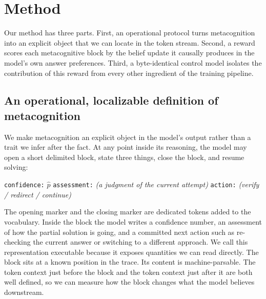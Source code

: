 \section{Method}
\label{sec:method}

Our method has three parts. First, an operational protocol turns metacognition
into an explicit object that we can locate in the token stream. Second, a reward
scores each metacognitive block by the belief update it causally produces in the
model's own answer preferences. Third, a byte-identical control model isolates
the contribution of this reward from every other ingredient of the training
pipeline.

\subsection{An operational, localizable definition of metacognition}
\label{sec:method:protocol}

We make metacognition an explicit object in the model's output rather than a
trait we infer after the fact. At any point inside its reasoning, the model may
open a short delimited block, state three things, close the block, and resume
solving:
\begin{center}
\metaopen{} \texttt{confidence:} $\hat{p}$ \quad
\texttt{assessment:} \emph{(a judgment of the current attempt)} \quad
\texttt{action:} \emph{(verify / redirect / continue)} \metaclose{}
\end{center}
The opening marker \metaopen{} and the closing marker \metaclose{} are dedicated
tokens added to the vocabulary. Inside the block the model writes a confidence
number, an assessment of how the partial solution is going, and a committed next
action such as re-checking the current answer or switching to a different
approach. We call this representation executable because it exposes quantities we
can read directly. The block sits at a known position in the trace. Its content
is machine-parsable. The token context just before the block and the token
context just after it are both well defined, so we can measure how the block
changes what the model believes downstream.

